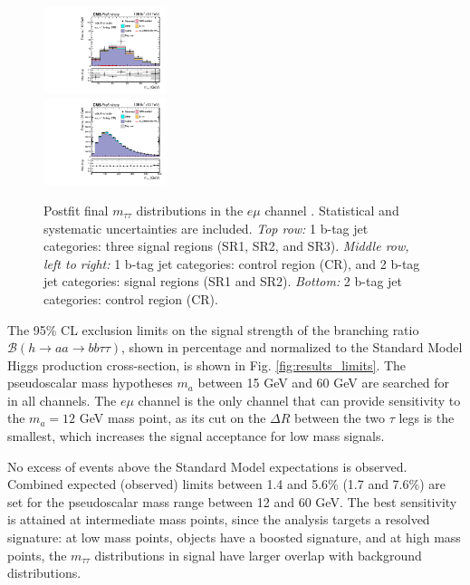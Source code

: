 \begin{figure}[ht]
\begin{center}
        \includegraphics[width=0.32\textwidth]{figures/ch-10-results/em_all_6_post_prelim-yes.pdf}\\
        \includegraphics[width=0.32\textwidth]{figures/ch-10-results/em_all_7_post_prelim-yes.pdf}
    \end{center}
    \caption[Postfit final $m_{\tau\tau}$ distributions in the $e\mu$ channel.]{Postfit final $m_{\tau\tau}$ distributions in the $e\mu$ channel \cite{CMS-AN-20-213}. Statistical and systematic uncertainties are included. \textit{Top row:} 1 b-tag jet categories: three signal regions (SR1, SR2, and SR3). \textit{Middle row, left to right:} 1 b-tag jet categories: control region (CR), and 2 b-tag jet categories: signal regions (SR1 and SR2). \textit{Bottom:} 2 b-tag jet categories: control region (CR).}
    \label{fig:results_mtt_postfit_emall}
\end{figure}


The 95\% CL exclusion limits on the signal strength of the branching ratio $\mathcal{B}(h \rightarrow aa \rightarrow bb\tau\tau)$, shown in percentage and normalized to the Standard Model Higgs production cross-section, is shown in Fig. \ref{fig:results_limits}. The pseudoscalar mass hypotheses $m_a$ between 15 GeV and 60 GeV are searched for in all channels. The $e\mu$ channel is the only channel that can provide sensitivity to the $m_a = 12$ GeV mass point, as its cut on the $\Delta R$ between the two $\tau$ legs is the smallest, which increases the signal acceptance for low mass signals.

No excess of events above the Standard Model expectations is observed. Combined expected (observed) limits between 1.4 and 5.6\% (1.7 and 7.6\%) are set for the pseudoscalar mass range between 12 and 60 GeV. The best sensitivity is attained at intermediate mass points, since the analysis targets a resolved signature: at low mass points, objects have a boosted signature, and at high mass points, the $m_{\tau\tau}$ distributions in signal have larger overlap with background distributions.

